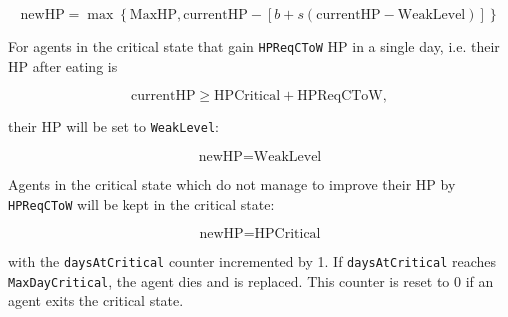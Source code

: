 \begin{equation}\label{hpDecay_bounded}
    \text{newHP} =\max\left\{\text{MaxHP}, \text{currentHP}-\left[b + s(\text{currentHP}-\text{WeakLevel})\right]\right\}
\end{equation}

For agents in the critical state that gain \texttt{HPReqCToW} HP in a single day, i.e. their HP after eating is

\begin{equation}\label{HPReqCToW}
    \text{currentHP} \geq \text{HPCritical}+\text{HPReqCToW},
\end{equation}

their HP will be set to \texttt{WeakLevel}:

\begin{equation}\label{hpDecay_critical_upgrade}
    \text{newHP} = \text{WeakLevel}
\end{equation}

Agents in the critical state which do not manage to improve their HP by \lstinline$HPReqCToW$ will be kept in the critical state:

\begin{equation}\label{hpDecay_critical_stay}
    \text{newHP} = \text{HPCritical}
\end{equation}

with the \texttt{daysAtCritical} counter incremented by 1. If \texttt{daysAtCritical} reaches \texttt{MaxDayCritical}, the agent dies and is replaced. This counter is reset to 0 if an agent exits the critical state.